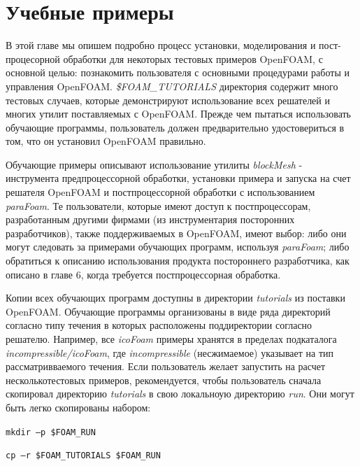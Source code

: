 \chapter{Учебные примеры}
В этой главе мы опишем подробно процесс установки, моделирования и пост- процесорной обработки для некоторых тестовых
 примеров OpenFOAM, с основной целью: познакомить пользователя с основными процедурами работы и управления OpenFOAM.
 \textit{\$FOAM\_TUTORIALS} директория содержит много тестовых случаев, которые демонстрируют использование всех
 решателей и многих утилит поставляемых с OpenFOAM. Прежде чем пытаться использовать обучающие программы, пользователь
 должен предварительно удостовериться  в том, что он установил OpenFOAM правильно.

Обучающие примеры описывают использование утилиты \textsl{blockMesh} - инструмента предпроцессорной обработки, установки 
примера и запуска на счет решателя OpenFOAM и постпроцессорной обработки с использованием \textsl{paraFoam}.
 Те пользователи, которые имеют доступ к постпроцессорам, разработанным другими фирмами (из инструментария посторонних
 разработчиков), также поддерживаемых в OpenFOAM, имеют выбор: либо они могут следовать за примерами обучающих программ,
 используя \textsl{paraFoam}; либо обратиться к описанию использования продукта постороннего разработчика, как описано в
главе 6, когда требуется постпроцессорная обработка.

Копии всех обучающих программ доступны в директории \textit{tutorials} из поставки OpenFOAM.
Обучающие программы организованы
 в виде ряда директорий согласно типу течения в которых расположены поддиректории согласно решателю. Например,
 все \textsl{icoFoam} примеры хранятся в пределах подкаталога
 \textit{incompressible/icoFoam}, где \textit{incompressible}
(несжимаемое)  указывает на тип рассматривваемого течения. Если пользователь желает запустить на расчет несколькотестовых 
примеров,  рекомендуется, чтобы пользователь сначала скопировал директорию \textit{tutorials} в свою локальноую директорию
\textit{run}. Они могут быть легко скопированы набором:

\texttt{mkdir –p \$FOAM\_RUN}

\texttt{cp –r \$FOAM\_TUTORIALS \$FOAM\_RUN}

